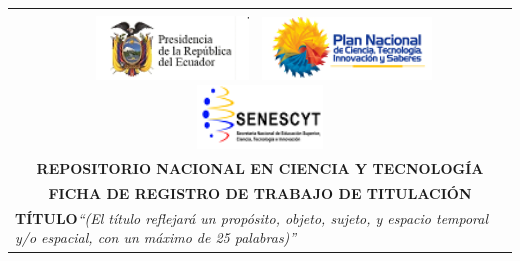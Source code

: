 \documentclass[12pt, a4paper, nofontenc, numbers=endperiod]{apa7}
\begin{document}
	{ %
		
		\section*{}
		\begin{center}
			{\renewcommand{\arraystretch}{2}		
				\centering \singlespacing
				\begin{tabular}{|p{1.5cm} l|l|}  
					\hline
					\multicolumn{3}{|l|}{}\\
					\multicolumn{3}{|c|}{
						
						\includegraphics[width=4.5cm,height=1.7cm]{Imagenes/Figura3}
						\includegraphics[width=4.5cm,height=1.7cm]{Imagenes/Figura4}
						\includegraphics[width=4.5cm,height=1.7cm]{Imagenes/Figura5}}  \\
					\hline
					\multicolumn{3}{|c|}{\textbf{\footnotesize REPOSITORIO NACIONAL EN CIENCIA Y TECNOLOGÍA}}\\
					\hline
					\multicolumn{3}{|c|}{\textbf{\footnotesize FICHA DE REGISTRO DE TRABAJO DE TITULACIÓN}}\\
					
					\hline
					
					\multicolumn{3}{|p{15cm}|}{\textbf{TÍTULO}\textit{``(El título reflejará un propósito, objeto, sujeto, y espacio temporal  y/o espacial, con un máximo de 25 palabras)''}}  \\
					
					\hline
					

\end{tabular}}
\end{center}}
\end{document}
